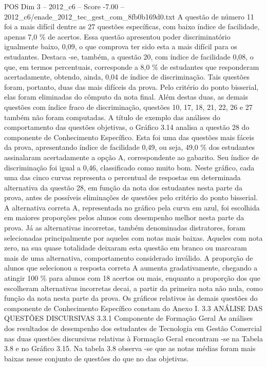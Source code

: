 \begin{textsample}{POS Dim 3 – 2012\_c6 – Score -7.00 – 2012\_c6/enade\_2012\_tec\_gest\_com\_8fb0b169d0.txt}
A questão de número 11 foi a mais difícil dentre as 27 questões específicas, com baixo índice de facilidade, apenas 7,0 \% de acertos.
Essa questão apresentou poder discriminatório igualmente baixo, 0,09, o que comprova ter sido esta a mais difícil para os estudantes.
Destaca -se, também, a questão 20, com índice de facilidade 0,08, o que, em termos percentuais, corresponde a 8,0 \% de estudantes que responderam acertadamente, obtendo, ainda, 0,04 de índice de discriminação.
Tais questões foram, portanto, duas das mais difíceis da prova.
Pelo critério do ponto bisserial, elas foram eliminadas do cômputo da nota final.
Além destas duas, as demais questões com índice fraco de discriminação, questões 10, 17, 18, 21, 22, 26 e 27 também não foram computadas.
A título de exemplo das análises do comportamento das questões objetivas, o Gráfico 3.14 analisa a questão 28 do componente de Conhecimento Específico.
Esta foi uma das questões mais fáceis da prova, apresentando índice de facilidade 0,49, ou seja, 49,0 \% dos estudantes assinalaram acertadamente a opção A, correspondente ao gabarito.
Seu índice de discriminação foi igual a 0,46, classificado como muito bom.
Neste gráfico, cada uma das cinco curvas representa o percentual de respostas em determinada alternativa da questão 28, em função da nota dos estudantes nesta parte da prova, antes de possíveis eliminações de questões pelo critério do ponto bisserial.
A alternativa correta A, representada no gráfico pela curva em azul, foi escolhida em maiores proporções pelos alunos com desempenho melhor nesta parte da prova.
Já as alternativas incorretas, também denominadas distratores, foram selecionadas principalmente por aqueles com notas mais baixas.
Aqueles com nota zero, na sua quase totalidade deixaram esta questão em branco ou marcaram mais de uma alternativa, comportamento considerado inválido.
A proporção de alunos que selecionou a resposta correta A aumenta gradativamente, chegando a atingir 100 \% para alunos com 18 acertos ou mais, enquanto a proporção dos que escolheram alternativas incorretas decai, a partir da primeira nota não nula, como função da nota nesta parte da prova.
Os gráficos relativos às demais questões do componente de Conhecimento Específico constam do Anexo I. 3.3 ANÁLISE DAS QUESTÕES DISCURSIVAS 3.3.1 Componente de Formação Geral As análises dos resultados de desempenho dos estudantes de Tecnologia em Gestão Comercial nas duas questões discursivas relativas à Formação Geral encontram -se na Tabela 3.8 e no Gráfico 3.15.
Na tabela 3.8 observa -se que as notas médias foram mais baixas nesse conjunto de questões do que no das objetivas.

\end{textsample}
